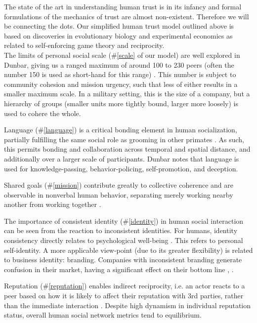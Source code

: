 \documentclass[10pt, twoside]{article}
\begin{document}
The state of the art in understanding human trust is in its infancy and formal formulations of the mechanics of trust are almost non-existent. Therefore we will be connecting the dots. Our simplified human trust model outlined above is based on discoveries in evolutionary biology and experimental economics as related to self-enforcing game theory and reciprocity. 
\\[10pt]

The limits of personal social scale (\#\ref{scale} of our model) are well explored in Dunbar, giving us a ranged maximum of around 100 to 230 peers (often the number 150 is used as short-hand for this range) \cite{dunbar1992neocortex}. This number is subject to community cohesion and mission urgency, such that less of either results in a smaller maximum scale.
In a military setting, this is the size of a company, but a hierarchy of groups (smaller units more tightly bound, larger more loosely) is used to cohere the whole.

Language (\#\ref{language}) is a critical bonding element in human socialization, partially fulfilling the same social role as grooming in other primates \cite{dunbar2004gossip}. As such, this permits bonding and collaboration across temporal and spatial distance, and additionally over a larger scale of participants. Dunbar notes that language is used for knowledge-passing, behavior-policing, self-promotion, and deception.

Shared goals (\#\ref{mission}) contribute greatly to collective coherence and are observable in nonverbal human behavior, separating merely working nearby another from working together \cite{sacheli2015social}. 

The importance of consistent identity (\#\ref{identity}) in human social interaction can be seen from the reaction to inconsistent identities. For humans, identity consistency directly relates to psychological well-being \cite{suh2002culture}. This refers to personal self-identity. A more applicable view-point (due to its greater flexibility) is related to business identity: branding. Companies with inconsistent branding generate confusion in their market, having a significant effect on their bottom line \cite{demand2016impact}, \cite{claye2013business}.

Reputation (\#\ref{reputation}) enables indirect reciprocity, i.e. an actor reacts to a peer based on how it is likely to affect their reputation with 3rd parties, rather than the immediate interaction \cite{phelps2012emergence}. Despite high dynamism in individual reputation status, overall human social network metrics tend to equilibrium.
\end{document}
